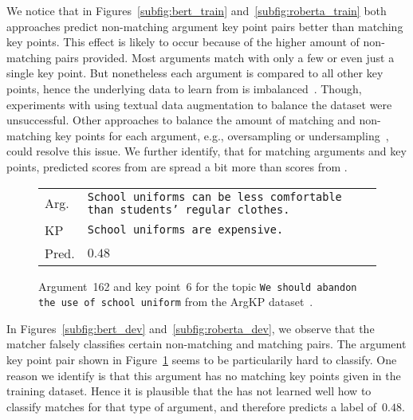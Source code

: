 We notice that in Figures~\ref{subfig:bert_train} and~\ref{subfig:roberta_train} both approaches predict non-matching argument key point pairs better than matching key points.
This effect is likely to occur because of the higher amount of non-matching pairs provided.
Most arguments match with only a few or even just a single key point.
But nonetheless each argument is compared to all other key points, hence the underlying data to learn from is imbalanced~\cite{BarandelaVSF2004}.
Though, experiments with using textual data augmentation to balance the dataset were unsuccessful.
Other approaches to balance the amount of matching and non-matching key points for each argument, e.g., oversampling or undersampling~\cite{Dietterich1995}, could resolve this issue.
We further identify, that for matching arguments and key points, predicted scores from \BertBase are spread a bit more than scores from \RobertaBase.

\begin{figure}
    \begin{tabularx}{\linewidth}{@{}lX@{}}
        Arg. & \texttt{School uniforms can be less comfortable than students' regular clothes.} \\
        KP & \texttt{School uniforms are expensive.} \\
        Pred. & \(0.48\) \\
    \end{tabularx}
    \caption{Argument~162 and key point~6 for the topic \texttt{We should abandon the use of school uniform} from the ArgKP dataset~\cite{Bar-HaimEFKLS2020}.}
    \label{example-4-162-6}
\end{figure}
In Figures~\ref{subfig:bert_dev} and~\ref{subfig:roberta_dev}, we observe that the \BertBase matcher falsely classifies certain non-matching and matching pairs. The argument key point pair shown in Figure~\ref{example-4-162-6} seems to be particularily hard to classify.
One reason we identify is that this argument has no matching key points given in the training dataset.
Hence it is plausible that the \BertBase has not learned well how to classify matches for that type of argument, and therefore predicts a label of~\(0.48\).

